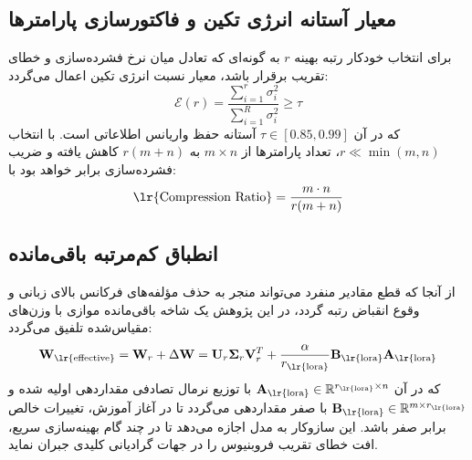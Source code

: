 \documentclass[12pt,a4paper]{report}
\theoremstyle{definition}
\begin{document}
\subsection{معیار آستانه انرژی تکین و فاکتورسازی پارامترها}
برای انتخاب خودکار رتبه بهینه $r$ به گونه‌ای که تعادل میان نرخ فشرده‌سازی و خطای تقریب برقرار باشد، معیار نسبت انرژی تکین  اعمال می‌گردد:
\begin{equation}
\mathcal{E}(r) = \frac{\sum_{i=1}^r \sigma_i^2}{\sum_{i=1}^R \sigma_i^2} \ge \tau
\end{equation}
که در آن $\tau \in [0.85, 0.99]$ آستانه حفظ واریانس اطلاعاتی است. با انتخاب $r \ll \min(m, n)$، تعداد پارامترها از $m \times n$ به $r(m + n)$ کاهش یافته و ضریب فشرده‌سازی برابر خواهد بود با:
\begin{equation}
\text{\lr{Compression Ratio}} = \frac{m \cdot n}{r(m + n)}
\end{equation}

\subsection{انطباق کم‌مرتبه باقی‌مانده }
از آنجا که قطع مقادیر منفرد می‌تواند منجر به حذف مؤلفه‌های فرکانس بالای زبانی و وقوع انقباض رتبه  گردد، در این پژوهش یک شاخه باقی‌مانده موازی با وزن‌های مقیاس‌شده  \cite{hu2021lora} تلفیق می‌گردد:
\begin{equation}
\mathbf{W}_{\text{\lr{effective}}} = \mathbf{W}_r + \Delta \mathbf{W} = \mathbf{U}_r \mathbf{\Sigma}_r \mathbf{V}_r^T + \frac{\alpha}{r_{\text{\lr{lora}}}} \mathbf{B}_{\text{\lr{lora}}} \mathbf{A}_{\text{\lr{lora}}}
\end{equation}
که در آن $\mathbf{A}_{\text{\lr{lora}}} \in \mathbb{R}^{r_{\text{\lr{lora}}} \times n}$ با توزیع نرمال تصادفی مقداردهی اولیه شده و $\mathbf{B}_{\text{\lr{lora}}} \in \mathbb{R}^{m \times r_{\text{\lr{lora}}}}$ با صفر مقداردهی می‌گردد تا در آغاز آموزش، تغییرات خالص برابر صفر باشد. این سازوکار به مدل اجازه می‌دهد تا در چند گام بهینه‌سازی سریع، افت خطای تقریب فروبنیوس را در جهات گرادیانی کلیدی جبران نماید.
\end{document}

